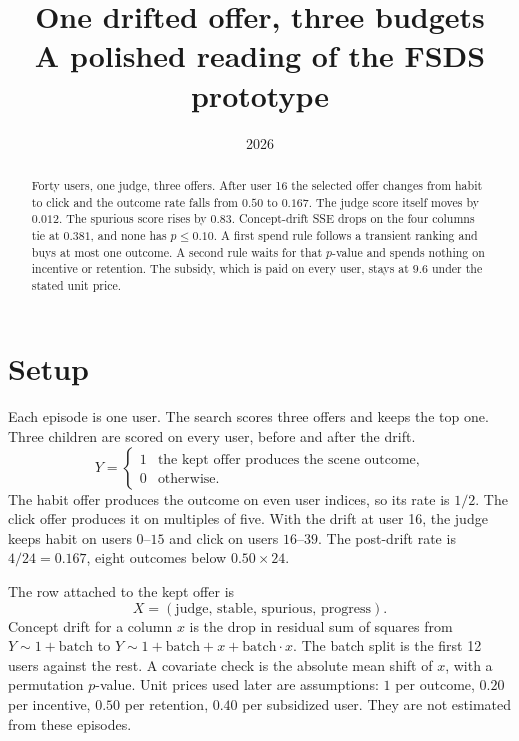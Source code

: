 \documentclass[11pt,a4paper]{article}
\title{One drifted offer, three budgets\\
\large A polished reading of the FSDS prototype}
\author{}
\date{2026}
\begin{document}
\maketitle

\begin{abstract}
Forty users, one judge, three offers. After user 16 the selected offer changes from habit to click and the outcome rate falls from \(0.50\) to \(0.167\). The judge score itself moves by \(0.012\). The spurious score rises by \(0.83\). Concept-drift SSE drops on the four columns tie at \(0.381\), and none has \(p\le 0.10\). A first spend rule follows a transient ranking and buys at most one outcome. A second rule waits for that \(p\)-value and spends nothing on incentive or retention. The subsidy, which is paid on every user, stays at \(9.6\) under the stated unit price.
\end{abstract}

\section{Setup}
Each episode is one user. The search scores three offers and keeps the top one. Three children are scored on every user, before and after the drift.
\[
Y=\begin{cases}
1 & \text{the kept offer produces the scene outcome},\\
0 & \text{otherwise}.
\end{cases}
\]
The habit offer produces the outcome on even user indices, so its rate is \(1/2\). The click offer produces it on multiples of five. With the drift at user 16, the judge keeps habit on users \(0\)--\(15\) and click on users \(16\)--\(39\). The post-drift rate is \(4/24=0.167\), eight outcomes below \(0.50\times 24\).

The row attached to the kept offer is
\[
X=(\mathrm{judge},\,\mathrm{stable},\,\mathrm{spurious},\,\mathrm{progress}).
\]
Concept drift for a column \(x\) is the drop in residual sum of squares from \(Y\sim 1+\mathrm{batch}\) to \(Y\sim 1+\mathrm{batch}+x+\mathrm{batch}\cdot x\). The batch split is the first 12 users against the rest. A covariate check is the absolute mean shift of \(x\), with a permutation \(p\)-value. Unit prices used later are assumptions: \(1\) per outcome, \(0.20\) per incentive, \(0.50\) per retention, \(0.40\) per subsidized user. They are not estimated from these episodes.
\end{document}
